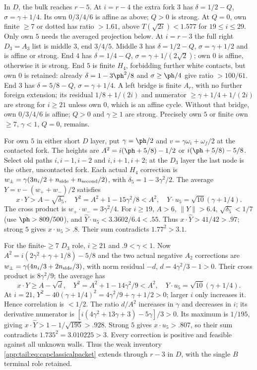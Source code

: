 In $D$, the bulk reaches $r-5$. At $i=r-4$ the extra fork $3$
has $\delta=1/2-Q$, $\sigma=\gamma+1/4$.
Its own $0/3/4/6$ is affine as above; $Q>0$ is strong.
At $Q=0$, own finite $\ge7$ or dotted has ratio $>1.61$,
above $T(\sqrt{2i})<1.577$ for $19\le i\le29$.
Only own $5$ needs the averaged projection below.
At $i=r-3$ the full right $D_3=A_3$ list is middle $3$, end $3/4/5$.
Middle $3$ has $\delta=1/2-Q$, $\sigma=\gamma+1/2$ and is
affine or strong. End $4$ has $\delta=1/4-Q$,
$\sigma=\gamma+1/(2\sqrt2)$; own $0$ is affine, otherwise it is
strong. End $5$ is finite $H_4$, forbidding further white contacts,
but own $0$ is retained: already
$\delta=1-3\ph^2/8$ and $\sigma\ge\ph/4$ give ratio $>100/61$.
End $3$ has $\delta=5/8-Q$, $\sigma=\gamma+1/4$.
A left bridge is finite $A_r$, with no further foreign extension;
its residual $1/8+1/(2i)$ and numerator
$\ge\gamma+1/4+1/(2i)$ are strong for $i\ge21$ unless own $0$,
which is an affine cycle. Without that bridge, own $0/3/4/6$ is
affine; $Q>0$ and $\gamma\ge1$ are strong. Precisely own $5$ or
finite own $\ge7$, $\gamma<1$, $Q=0$, remains.

For own $5$ in either short $D$ layer, put $\gamma=\ph/2$ and
$v=\gamma\omega_i+\omega_f/2$ at the contacted fork.
The heights are $A^2=i(\ph+5/8)-1/2$ or
$i(\ph+5/8)-5/8$. Select old paths $i,i-1,i-2$ and
$i,i+1,i+2$; at the $D_3$ layer the last node is the other,
uncontacted fork. Each actual $H_4$ correction is
$w_\pm=\gamma(3n_i/2+n_{\rm side}+n_{\rm second}/2)$,
with $\delta_5=1-3\gamma^2/2$.
The average $Y=v-(w_++w_-)/2$ satisfies
\[
 x\cdot Y>A-\sqrt{\delta_5},\quad
 Y^2=A^2+1-15\gamma^2/8<A^2,\quad
 Y\cdot u_5=\sqrt{10}(\gamma+1/4).
\]
The cross product is $w_+\cdot w_-=3\gamma^2/4$.
For $i\ge19$, $A>6$, $\|Y\|>6.4$,
$\sqrt{\delta_5}<1/7$ (use $\ph>809/500$), and
$\widehat Y\cdot u_5<3.3602/6.4<.55$.
Thus $x\cdot\widehat Y>41/42>.97$; strong $5$ gives
$x\cdot u_5>.8$. Their sum contradicts $1.77^2>3.1$.

For the finite-$\ge7$ $D_3$ role, $i\ge21$ and
$.9<\gamma<1$. Now
$A^2=i(2\gamma^2+\gamma+1/8)-5/8$ and the two actual negative
$A_2$ corrections are $w_\pm=\gamma(4n_i/3+2n_{\rm side}/3)$,
with norm residual $-d$, $d=4\gamma^2/3-1>0$.
Their cross product is $8\gamma^2/9$; the average has
\[
 x\cdot Y\ge A-\sqrt d,\quad
 Y^2=A^2+1-14\gamma^2/9<A^2,
 \quad Y\cdot u_5=\sqrt{10}(\gamma+1/4).
\]
At $i=21$,
$Y^2-40(\gamma+1/4)^2=4\gamma^2/9+\gamma+1/2>0$;
larger $i$ only increases it. Hence correlation is $<1/2$.
The ratio $d/A^2$ increases in $\gamma$ and decreases in $i$;
its derivative numerator is
$[i(4\gamma^2+13\gamma+3)-5\gamma]/3>0$.
Its maximum is $1/195$, giving
$x\cdot\widehat Y>1-1/\sqrt{195}>.928$.
Strong $5$ gives $x\cdot u_5>.807$, so their sum contradicts
$1.735^2=3.010225>3$.
Every correction is positive and feasible against all unknown walls.
Thus the weak inventory \eqref{app:tail:eq:capclassicalpacket} extends
through $r-3$ in $D$, with the single $B$ terminal role retained.

